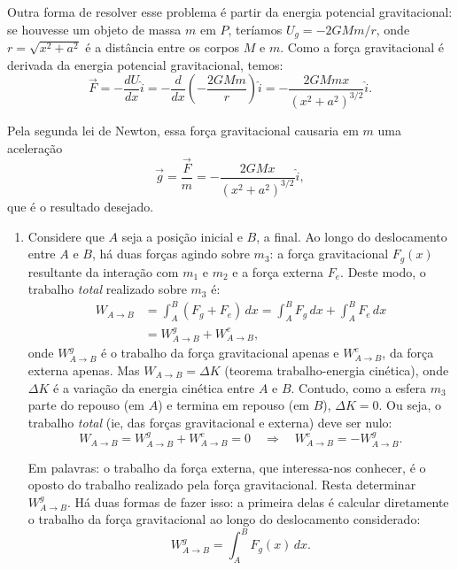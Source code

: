 \documentclass[a4paper]{article}
\newcommand\myrightarrow{\quad\Rightarrow\quad}
\begin{document}
\begin{resolucoes}
\begin{exercicio}
  Outra forma de resolver esse problema é partir da energia potencial gravitacional: se houvesse um objeto de massa $m$ em $P$, teríamos $U_g = -2GMm/r$, onde $r = \sqrt{x^2 + a^2}$ é a distância entre os corpos $M$ e $m$.
  Como a força gravitacional é derivada da energia potencial gravitacional, temos:
  \begin{equation*}
  \vec F = -\frac{dU}{dx}\hat i = -\frac{d}{dx}\left(-\frac{2GMm}{r}\right)\hat i = -\frac{2GMmx}{\left(x^2 + a^2\right)^{3/2}}\hat i.
  \end{equation*}
  
  Pela segunda lei de Newton, essa força gravitacional causaria em $m$ uma aceleração
  \begin{equation*}
  \vec g = \frac{\vec F}{m} = -\frac{2GMx}{\left(x^2 + a^2\right)^{3/2}}\hat i,
  \end{equation*}
  que é o resultado desejado.  
  \end{exercicio}
  
  \begin{exercicio}
  
  \begin{enumerate}
  \item Considere que $A$ seja a posição inicial e $B$, a final.
  Ao longo do deslocamento entre $A$ e $B$, há duas forças agindo sobre $m_3$: a força gravitacional $F_g(x)$ resultante da interação com $m_1$ e $m_2$ e a força externa $F_e$.
  Deste modo, o trabalho \emph{total} realizado sobre $m_3$ é:
  \begin{align*}
  W_{A\to B} &= \int_{A}^{B}\left(F_g + F_e\right)\, dx = \int_{A}^{B}F_g\, dx + \int_{A}^{B}F_e\, dx \\
             &= W_{A\to B}^{g} + W_{A\to B}^{e},
  \end{align*}
  onde $W_{A\to B}^{g}$ é o trabalho da força gravitacional apenas e $W_{A\to B}^{e}$, da força externa apenas.
  Mas $W_{A\to B} = \Delta K$ (teorema trabalho-energia cinética), onde $\Delta K$ é a variação da energia cinética entre $A$ e $B$.
  Contudo, como a esfera $m_3$ parte do repouso (em $A$) e termina em repouso (em $B$), $\Delta K = 0$.
  Ou seja, o trabalho \emph{total} (ie, das forças gravitacional e externa) deve ser nulo:
  \begin{equation}\label{eq:W}
  W_{A\to B} = W_{A\to B}^{g} + W_{A\to B}^{e} = 0 \myrightarrow W_{A\to B}^{e} = -W_{A\to B}^{g}.
  \end{equation}
  
  Em palavras: o trabalho da força externa, que interessa-nos conhecer, é o oposto do trabalho realizado pela força gravitacional.  
  Resta determinar $W_{A\to B}^{g}$.
  Há duas formas de fazer isso: a primeira delas é calcular diretamente o trabalho da força gravitacional ao longo do deslocamento considerado:
  \begin{equation*}
  W_{A\to B}^{g} = \int_{A}^{B} F_g(x)\,dx.
  \end{equation*}
  

\end{enumerate}
\end{exercicio}
\end{resolucoes}
\end{document}
